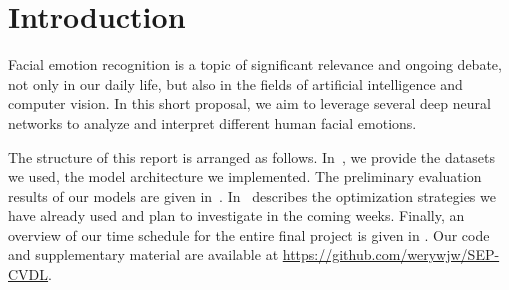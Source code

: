 \section{Introduction}
\label{sec:intro}

Facial emotion recognition is a topic of significant relevance and ongoing debate, not only in our daily life, but also in the fields of artificial intelligence and computer vision.
In this short proposal, we aim to leverage several deep neural networks to analyze and interpret different human facial emotions.

The structure of this report is arranged as follows. 
In~, 
we provide the datasets we used, 
the model architecture we implemented. 
The preliminary evaluation results of our models are given in~. 
In~ describes the optimization strategies we have already used and plan to investigate in the coming weeks. 
Finally,
an overview of our time schedule for the entire final project is given in . 
Our code and supplementary material are available at \url{https://github.com/werywjw/SEP-CVDL}.

